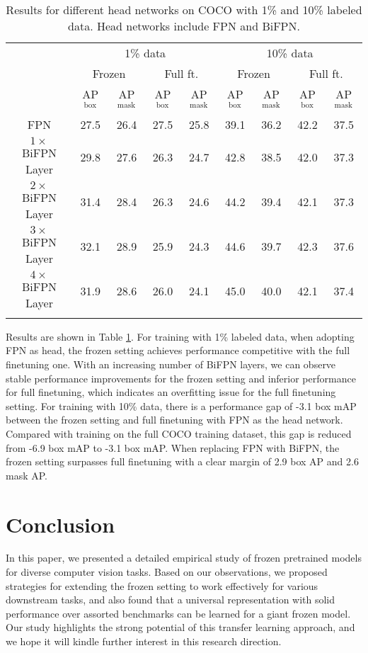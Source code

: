 \documentclass{article}
\begin{document}
\begin{table}[h]
        \centering
        \begin{tabular}{c|cccc|cccc}
            \Xhline{1.0pt}
            \multirow{3}{*}{Head Network} &  \multicolumn{4}{c|}{1\% data} & \multicolumn{4}{c}{10\% data} \\
            & \multicolumn{2}{c}{Frozen} & \multicolumn{2}{c|}{Full ft.} & \multicolumn{2}{c}{Frozen} & \multicolumn{2}{c}{Full ft.} \\
            & AP$^\text{box}$ & AP$^\text{mask}$ & AP$^\text{box}$ & AP$^\text{mask}$ & AP$^\text{box}$ & AP$^\text{mask}$ & AP$^\text{box}$ & AP$^\text{mask}$ \\
            \hline
            FPN & 27.5 & 26.4 & 27.5 & 25.8 & 39.1 & 36.2 & 42.2 & 37.5 \\
            $1\times$ BiFPN Layer & 29.8 & 27.6 & 26.3 & 24.7 & 42.8 & 38.5 & 42.0 & 37.3 \\
            $2\times$ BiFPN Layer & 31.4 & 28.4 & 26.3 & 24.6 & 44.2 & 39.4  & 42.1 & 37.3 \\
            $3\times$ BiFPN Layer & 32.1 & 28.9 & 25.9 & 24.3 & 44.6 & 39.7 & 42.3 & 37.6 \\
            $4\times$ BiFPN Layer & 31.9 & 28.6 & 26.0 & 24.1 & 45.0 & 40.0 & 42.1 & 37.4 \\
          \Xhline{1.0pt}  
       \end{tabular}
       \caption{Results for different head networks on COCO with 1\% and 10\% labeled data. Head networks include FPN and BiFPN.}
    \label{tab:semi_coco}
\end{table}

Results are shown in Table \ref{tab:semi_coco}. For training with 1\% labeled data, when adopting FPN as head, the frozen setting achieves performance competitive with the full finetuning one. With an increasing number of BiFPN layers, we can observe stable performance improvements for the frozen setting and inferior performance for full finetuning, which indicates an overfitting issue for the full finetuning setting.
For training with 10\% data, there is a performance gap of -3.1 box mAP between the frozen setting and full finetuning with FPN as the head network. Compared with training on the full COCO training dataset, this gap is reduced from -6.9 box mAP to -3.1 box mAP. When replacing FPN with BiFPN, the frozen setting surpasses full finetuning with a clear margin of 2.9 box AP and 2.6 mask AP.

\section{Conclusion}
In this paper, we presented a detailed empirical study of frozen pretrained models for diverse computer vision tasks. Based on our observations, we proposed strategies for extending the frozen setting to work effectively for various downstream tasks, and also found that a universal representation with solid performance over assorted benchmarks can be learned for a giant frozen model. Our study highlights the strong potential of this transfer learning approach, and we hope it will kindle further interest in this research direction.
\end{document}
